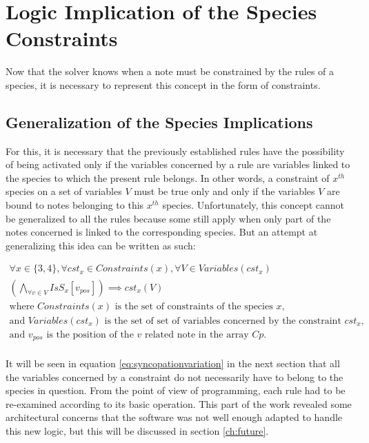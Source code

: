 \section{Logic Implication of the Species Constraints}
Now that the solver knows when a note must be constrained by the rules of a species, it is necessary to represent this concept in the form of constraints.

\subsection{Generalization of the Species Implications}
For this, it is necessary that the previously established rules have the possibility of being activated only if the variables concerned by a rule are variables linked to the species to which the present rule belongs. In other words, a constraint of $x^{th}$ species on a set of variables $V$ must be true only and only if the variables $V$ are bound to notes belonging to this $x^{th}$ species. Unfortunately, this concept cannot be generalized to all the rules because some still apply when only part of the notes concerned is linked to the corresponding species. But an attempt at generalizing this idea can be written as such:

\begin{equation}
    \begin{gathered}
        \forall x \in \{3, 4\}, \forall cst_{x} \in Constraints(x), \forall V \in Variables(cst_{x})\\
        \left(\bigwedge_{\forall v \in V} IsS_{x}[v_{pos}]\right) \implies cst_{x}(V)\\
        \text{where }Constraints(x) \text{ is the set of constraints of the species }x,\\
        \text{and }Variables(cst_{x}) \text{ is the set of set of variables concerned by the constraint }cst_{x},\\
        \text{and }v_{pos} \text{ is the position of the } v \text{ related note in the array }Cp.\\
    \end{gathered}
\end{equation}

It will be seen in equation \ref{eq:syncopationvariation} in the next section that all the variables concerned by a constraint do not necessarily have to belong to the species in question. From the point of view of programming, each rule had to be re-examined according to its basic operation. This part of the work revealed some architectural concerns that the software was not well enough adapted to handle this new logic, but this will be discussed in section \ref{ch:future}.


